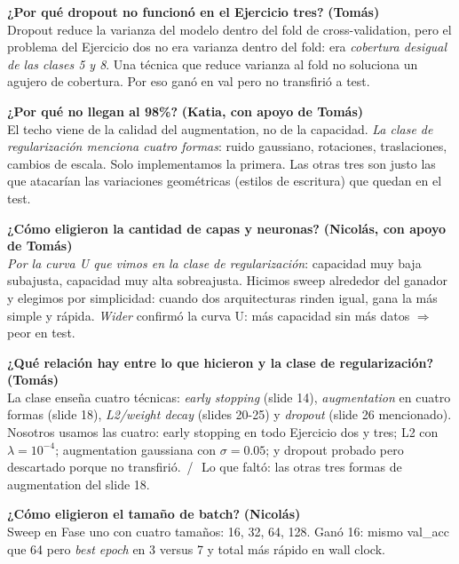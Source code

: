 \documentclass[11pt,a4paper]{article}
\newcommand{\enunciado}[1]{\textcolor{warn}{\textit{#1}}}
\newcommand{\pausa}{\textcolor{muted}{\,/\,}}
\begin{document}
\begin{cue}
\textbf{¿Por qué dropout no funcionó en el Ejercicio tres?} \textbf{(Tomás)}\\
Dropout reduce la varianza del modelo dentro del fold de cross-validation, pero el problema del Ejercicio dos no era varianza dentro del fold: era \emph{cobertura desigual de las clases 5 y 8}. Una técnica que reduce varianza al fold no soluciona un agujero de cobertura. Por eso ganó en val pero no transfirió a test.
\end{cue}

\begin{cue}
\textbf{¿Por qué no llegan al 98\%?} \textbf{(Katia, con apoyo de Tomás)}\\
El techo viene de la calidad del augmentation, no de la capacidad. \enunciado{La clase de regularización menciona cuatro formas}: ruido gaussiano, rotaciones, traslaciones, cambios de escala. Solo implementamos la primera. Las otras tres son justo las que atacarían las variaciones geométricas (estilos de escritura) que quedan en el test.
\end{cue}

\begin{cue}
\textbf{¿Cómo eligieron la cantidad de capas y neuronas?} \textbf{(Nicolás, con apoyo de Tomás)}\\
\enunciado{Por la curva U que vimos en la clase de regularización}: capacidad muy baja subajusta, capacidad muy alta sobreajusta. Hicimos sweep alrededor del ganador y elegimos por simplicidad: cuando dos arquitecturas rinden igual, gana la más simple y rápida. \emph{Wider} confirmó la curva U: más capacidad sin más datos $\Rightarrow$ peor en test.
\end{cue}

\begin{cue}
\textbf{¿Qué relación hay entre lo que hicieron y la clase de regularización?} \textbf{(Tomás)}\\
La clase enseña cuatro técnicas: \emph{early stopping} (slide 14), \emph{augmentation} en cuatro formas (slide 18), \emph{L2/weight decay} (slides 20-25) y \emph{dropout} (slide 26 mencionado). Nosotros usamos las cuatro: early stopping en todo Ejercicio dos y tres; L2 con $\lambda = 10^{-4}$; augmentation gaussiana con $\sigma = 0.05$; y dropout probado pero descartado porque no transfirió. \pausa\ Lo que faltó: las otras tres formas de augmentation del slide 18.
\end{cue}

\begin{cue}
\textbf{¿Cómo eligieron el tamaño de batch?} \textbf{(Nicolás)}\\
Sweep en Fase uno con cuatro tamaños: 16, 32, 64, 128. Ganó 16: mismo val\_acc que 64 pero \emph{best epoch} en 3 versus 7 y total más rápido en wall clock.
\end{cue}
\end{document}
